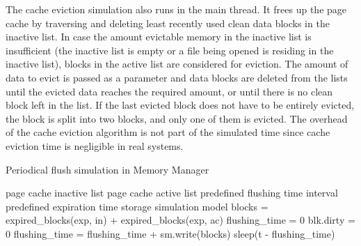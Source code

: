 \documentclass[conference]{IEEEtran}
\newcommand{\Desc}[2]{\State \makebox[2em][l]{#1}#2}
\newcommand{\tristan}[1]{\color{orange}\textbf{From Tristan:}#1\color{black}}
\begin{document}
    The cache eviction simulation also runs in
    the main thread. It frees up the page cache by traversing and deleting
    least recently used clean data blocks in the inactive list.
    In case the amount evictable memory in the inactive list is insufficient 
    (the inactive list is empty or a file being opened is residing in the inactive list), 
    blocks in the active list are considered for eviction. 
    The amount of data to evict is passed as a parameter and data blocks are deleted
    from the lists until the evicted data reaches the required amount,
    or until there is no clean block left in the list.
    If the last evicted block does not have to be entirely evicted, the block is split into two blocks,
    and only one of them is evicted.
    The overhead of the cache eviction algorithm is not part of the simulated time
    since cache eviction time is negligible in real systems. %

    \begin{algorithm}[b]\caption{Periodical flush simulation in Memory Manager}\label{alg:pdflush}
        \small
        \begin{algorithmic}[1]
            \Input
                \Desc{in}{page cache inactive list}
                \Desc{ac}{page cache active list}
                \Desc{t}{predefined flushing time interval}
                \Desc{exp}{predefined expiration time}
                \Desc{sm}{storage simulation model}
               \EndInput
                \State blocks = expired\_blocks(exp, in) + expired\_blocks(exp, ac)
                \State flushing\_time = 0
                  \State blk.dirty = 0 
                  \State flushing\_time = flushing\_time + sm.write(blocks)
                \EndFor
                    \State sleep(t - flushing\_time)
                \EndIf  
            \EndWhile
        \end{algorithmic}
    \end{algorithm}
\end{document}
